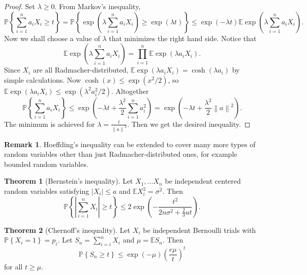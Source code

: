 \documentclass{article}
\theoremstyle{definition}
\newtheorem{theorem}{Theorem}[section]
\newtheorem{remark}{Remark}[section]
\begin{document}
  \begin{proof}
    Set \( \lambda \geq 0 \). From Markov's inequality,
    \[ \mathbb{P}\left\{ \sum_{i=1}^{n} a_i X_i \geq t \right\} =
      \mathbb{P}\left\{ \exp\left( \lambda \sum_{i=1}^{n} a_i X_i \right) \geq
      \exp\left( \lambda t\right) \right\} \leq \exp\left(-\lambda t\right)
    \mathbb{E}\exp\left(\lambda \sum_{i=1}^{n} a_i X_i\right).\]
    Now we shall choose a value of \( \lambda \) that minimizes
    the right hand side. Notice that
    \[
      \mathbb{E} \exp\left(\lambda \sum_{i=1}^{n} a_i X_i\right) =
      \prod_{i=1}^{n} \mathbb{E}\exp\left(\lambda a_i X_i\right).
    \]
    Since \( X_i \) are all Radmacher-distributed, \( \mathbb{E}
    \exp\left( \lambda a_i X_i \right) = \cosh(\lambda a_i) \) by
    simple calculations.
    Now \( \cosh(x) \leq \exp\left(x^2 / 2\right) \), so \(
      \mathbb{E}\exp\left(\lambda a_i X_i\right) \leq \exp\left(
    \lambda^2 a_{i}^{2} / 2\right) \).
    Altogether
    \[
      \mathbb{P}\left\{ \sum_{i=1}^{n} a_i X_i \right\} \leq \exp\left(
      -\lambda t + \frac{\lambda^2}{2} \sum_{i=1}^{n} a_i ^2\right) =
      \exp\left(-\lambda t + \frac{\lambda^2}{2} \left\|a\right\|^2\right).
    \]
    The minimum is achieved for \( \lambda =
    \frac{t}{\left\|a\right\|^2} \). Then we get the desired inequality.
  \end{proof}

  \begin{remark}
    Hoeffding's inequality can be extended to cover many more types of
    random variables other than just Radmacher-distributed ones, for
    example bounded random variables.
  \end{remark}

  \begin{theorem}[Bernstein's inequality]
    Let \( X_1, \dots X_n \) be independent centered random variables
    satisfying \( \left| X_i \right| \leq a \) and \( \mathbb{E}
    X_{i}^{2} = \sigma^{2} \). Then
    \[
      \mathbb{P}\left\{ \left| \sum_{i=1}^{n} X_i \right| \geq t
      \right\} \leq 2 \exp\left( - \frac{t^{2}}{2n \sigma^2 +
      \frac{2}{3}at}\right).
    \]
  \end{theorem}

  \begin{theorem}[Chernoff's inequality]
    Let \( X_i \) be independent Bernoulli trials with \(
    \mathbb{P}\left\{ X_i = 1 \right\} = p_i \).
    Let \( S_n = \sum_{i=i}^{n} X_i \) and \( \mu = \mathbb{E}S_n \).
    Then
    \[
      \mathbb{P}\left\{ S_n \geq t \right\} \leq \exp(- \mu) \left(
      \frac{e \mu}{t}  \right) ^{t}
    \]
    for all \( t \geq \mu  \).
  \end{theorem}
\end{document}
